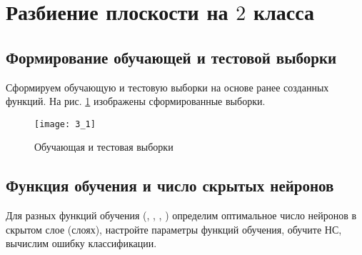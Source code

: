 \newpage

\section{Разбиение плоскости на $2$ класса}

\subsection{Формирование обучающей и тестовой выборки}

Сформируем обучающую и тестовую выборки на основе ранее созданных функций. На рис. \ref{fig:3_1} изображены сформированные выборки.
\begin{figure}[H]
\begin{center}
	\texttt{[image: 3\_1]}
	\caption{Обучающая и тестовая выборки}
	\label{fig:3_1}
\end{center}
\end{figure}

\subsection{Функция обучения и число скрытых нейронов}
\label{sec:inner_neurons}

Для разных функций обучения (, , , ) определим оптимальное число нейронов в скрытом слое (слоях), настройте параметры функций обучения, обучите НС, вычислим ошибку классификации.


